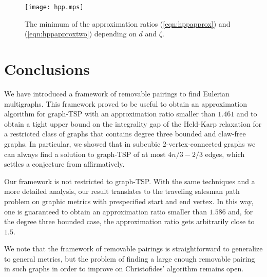 \documentclass[letterpaper,11pt]{article}
\newcommand{\TSP}{graph-TSP\xspace}
\begin{document}
\begin{figure}[tb]
    \begin{center}
        \texttt{[image: hpp.mps]}
    \end{center}
    \caption{The minimum of the approximation ratios (\ref{eqn:hppapprox}) and
    (\ref{eqn:hppapproxtwo}) depending on $d$ and $\zeta$.}
    \label{fig:ratioshpp}
\end{figure}
\section{Conclusions}
We have introduced a framework of removable pairings to find Eulerian
multigraphs.  This framework proved to be useful to obtain an
approximation algorithm for \TSP with an approximation ratio smaller
than $1.461$ and to obtain a tight upper bound on the integrality gap
of the Held-Karp relaxation for a restricted class of graphs that
contains degree three bounded and claw-free graphs. In particular, we
showed that in subcubic $2$-vertex-connected graphs we can always find a
solution to \TSP of at most $4n/3 - 2/3$ edges, which settles a
conjecture from \cite{BSSS11} affirmatively.

Our framework is not restricted to \TSP. With the same techniques
and a more detailed analysis, our result translates to the
traveling salesman path problem on graphic metrics with prespecified start and
end vertex.
In this way, one is guaranteed to obtain an approximation ratio smaller than $1.586$
and, for the degree three bounded case, the
approximation ratio gets arbitrarily close to $1.5$.

We note that the framework of removable pairings is straightforward
to generalize to general metrics, but the problem of finding a large
enough removable pairing in such graphs in order to improve on Christofides'
algorithm remains open.
\end{document}
